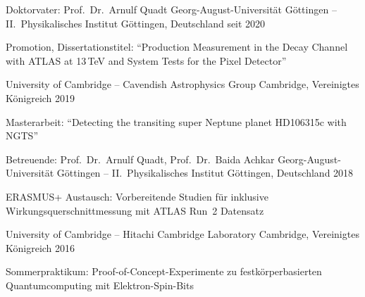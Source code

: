 %
\begin{cventries}%
  \cventry%
    {Doktorvater: Prof.\ Dr.\ Arnulf Quadt} %
    {Georg-August-Universit\"at G\"ottingen -- II.\ Physikalisches Institut} %
    {G\"ottingen, Deutschland} %
    {seit 2020} %
    {%
      \begin{cvitems} %
        \item {%
          Promotion, Dissertationstitel:\newline%
          ``\ttH Production Measurement in the \Hbb Decay Channel with ATLAS at 13\,TeV and System Tests for the Pixel Detector''%
        }%
      \end{cvitems}%
    }%

    {University of Cambridge -- Cavendish Astrophysics Group} %
    {Cambridge, Vereinigtes K\"onigreich} %
    {2019} %
    {%
      \begin{cvitems} %
        \item {Masterarbeit: ``Detecting the transiting super Neptune planet HD106315c with NGTS''}%
      \end{cvitems}%
    }%

  \cventry%
    {Betreuende: Prof.\ Dr.\ Arnulf Quadt, Prof.\ Dr.\ Baida Achkar} %
    {Georg-August-Universit\"at G\"ottingen -- II.\ Physikalisches Institut} %
    {G\"ottingen, Deutschland} %
    {2018} %
    {%
      \begin{cvitems} %
        \item {ERASMUS+ Austausch: Vorbereitende Studien f\"ur inklusive \ttbar Wirkungsquerschnittmessung mit ATLAS Run~2 Datensatz}%
      \end{cvitems}%
    }%

    {University of Cambridge -- Hitachi Cambridge Laboratory} %
    {Cambridge, Vereinigtes K\"onigreich} %
    {2016} %
    {%
      \begin{cvitems} %
        \item {Sommerpraktikum: Proof-of-Concept-Experimente zu festk\"orperbasierten Quantumcomputing mit Elektron-Spin-Bits}%
      \end{cvitems}%
    }%
\end{cventries}%
